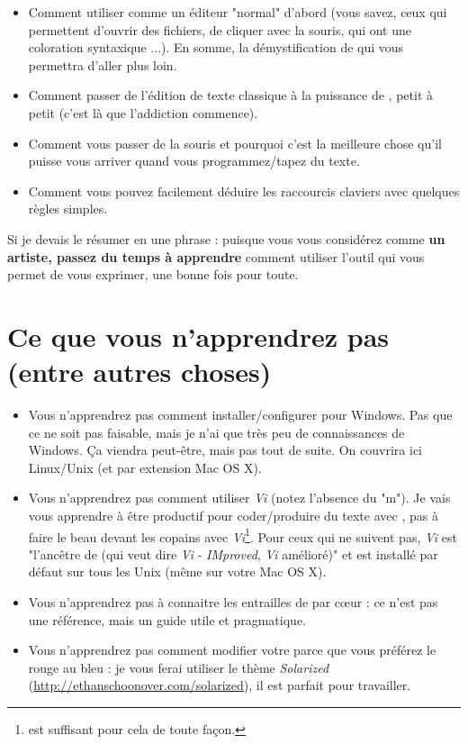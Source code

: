 \begin{itemize}
    \item Comment utiliser \vim comme un éditeur "normal" d'abord (vous savez, ceux qui permettent d'ouvrir des fichiers, de cliquer avec la souris, qui ont une coloration syntaxique ...). En somme, la démystification de \vim qui vous permettra d'aller plus loin.
    \item Comment passer de l'édition de texte classique à la puissance de \vim, petit à petit (c'est là que l'addiction commence).
    \item Comment vous passer de la souris et pourquoi c'est la meilleure chose qu'il puisse vous arriver quand vous programmez/tapez du texte.
    \item Comment vous pouvez facilement déduire les raccourcis claviers avec quelques règles simples.
\end{itemize}

Si je devais le résumer en une phrase : puisque vous vous considérez comme {\bf un artiste, passez du temps à apprendre} comment utiliser l'outil qui vous permet de vous exprimer, une bonne fois pour toute.

\section{Ce que vous n'apprendrez pas (entre autres choses)}

\begin{itemize}
    \item Vous n'apprendrez pas comment installer/configurer \vim pour Windows. Pas que ce ne soit pas faisable, mais je n'ai que très peu de connaissances de Windows. Ça viendra peut-être, mais pas tout de suite. On couvrira ici Linux/Unix (et par extension Mac OS X).
    \item Vous n'apprendrez pas comment utiliser \emph{Vi} (notez l'absence du "m"). Je vais vous apprendre à être productif pour coder/produire du texte avec \vim, pas à faire le beau devant les copains avec \emph{Vi}\footnote{\vim est suffisant pour cela de toute façon.}. Pour ceux qui ne suivent pas, \emph{Vi} est "l'ancêtre de \vim (qui veut dire \emph{Vi} - \emph{IMproved}, \emph{Vi} amélioré)" et est installé par défaut sur tous les Unix (même sur votre Mac OS X).
    \item Vous n'apprendrez pas à connaitre les entrailles de \vim par c\oe ur : ce n'est pas une référence, mais un guide utile et pragmatique.
    \item Vous n'apprendrez pas comment modifier votre \vim parce que vous préférez le rouge au bleu : je vous ferai utiliser le thème \emph{Solarized} (\url{http://ethanschoonover.com/solarized}), il est parfait pour travailler.
\end{itemize}

